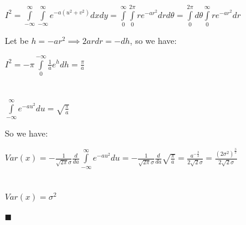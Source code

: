 \documentclass[paper=9in:6in,pagesize=pdftex,headinclude=on,footinclude=on,10pt,bibtotoc,pointlessnumbers,normalheadings,DIV=9,twoside=false]{scrbook}
\renewcommand\qedsymbol{$\blacksquare$}
\begin{document}
\begin{center}
    $I^2 = \int\limits_{-\infty}^{\infty} \int\limits_{-\infty}^{\infty} e^{-a(u^2+v^2)} dxdy = \int\limits_{0}^{\infty}\int\limits_{0}^{2\pi} r e^{-ar^2}drd\theta = \int\limits_{0}^{2\pi} d\theta \int\limits_{0}^{\infty} re^{-ar^2} dr$
\end{center}


\begin{text}
Let be $h=-ar^2 \implies 2ardr = -dh$, so we have:
\end{text}

\begin{center}
    $I^2 = -\pi \int\limits_{0}^{-\infty}\frac{1}{a} e^h dh = \frac{\pi}{a}$ \\
    
    \ \\
    \ \\
    
   $ \int\limits_{-\infty}^{\infty} e^{-au^2} du = \sqrt{\frac{\pi}{a}}$ \\
\end{center}

\begin{text}
So we have:
\end{text}

\begin{center}
    $Var(x) = -\frac{1}{\sqrt{2\pi}\sigma} \frac{d}{da} \int\limits_{-\infty}^{\infty} e^{-au^2} du = - \frac{1}{\sqrt{2\pi}\sigma} \frac{d}{da} \sqrt{\frac{\pi}{a}} = \frac{a^{-\frac{3}{2}}}{2\sqrt{2} \sigma} = \frac{(2\sigma^2)^{\frac{3}{2}}}{2\sqrt{2} \sigma}  $ \ \\
    
    \ \\
    \ \\
    
    $Var(x) = \sigma^2$ \\
    \ \\
    
    \hfill \qedsymbol
    
\end{center}
\end{document}
